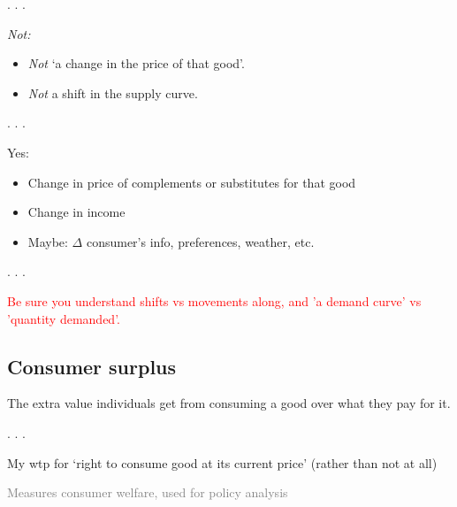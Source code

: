 \documentclass[]{article}
\providecommand{\tightlist}{%
  \setlength{\itemsep}{0pt}\setlength{\parskip}{0pt}}
\begin{document}
. . .

\emph{Not:}

\begin{itemize}
\tightlist
\item
  \emph{Not} `a change in the price of that good'.
\item
  \emph{Not} a shift in the supply curve.
\end{itemize}

. . .

Yes:

\begin{itemize}
\tightlist
\item
  Change in price of complements or substitutes for that good
\item
  Change in income
\item
  Maybe: \(\Delta\) consumer's info, preferences, weather, etc.
\end{itemize}

. . .


\textcolor{red}{Be sure you understand shifts vs movements along, and 'a demand curve' vs 'quantity demanded'.}



\hypertarget{consumer-surplus}{%
\subsection{Consumer surplus}\label{consumer-surplus}}

\begin{description}
\tightlist
\item[Consumer surplus]
The extra value individuals get from consuming a good over what they pay
for it.
\end{description}

. . .

My wtp for `right to consume good at its current price' (rather than not
at all)

\textcolor{gray}{Measures consumer welfare, used for policy analysis}
\end{document}
